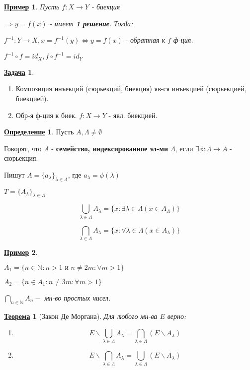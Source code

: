 \documentclass[12pt]{article}
\newcommand{\N}{\mathbb{N}}
\newtheorem{theorem}{\underline{Теорема}}[section]
\newtheorem*{example}{\underline{Пример}}
\theoremstyle{definition}
\newtheorem{definition}{\underline{Определение}}[section]
\theoremstyle{definition}
\newtheorem{task}{\underline{Задача}}[section]
\begin{document}
\begin{example}
Пусть $f: X \rightarrow Y$ - биекция

$\Rightarrow y = f(x)$ - имеет \textbf{1 решение}. Тогда:

$f^{-1}: Y \rightarrow X, x = f^{-1}(y) \iff y = f(x)$ - обратная к $f$ ф-ция.

$f^{-1} \circ f = id_X, f \circ f^{-1} = id_Y$
\end{example}

\begin{task}
\begin{enumerate}
    \item Композиция инъекций (сюрьекций, биекция) яв-ся инъекцией (сюрьекцией, биекцией).
    \item Обр-я ф-ция к биек. $f: X \rightarrow Y$ - явл. биекцией.
\end{enumerate}
\end{task}

\begin{definition}
Пусть $A, \Lambda \neq \emptyset$

Говорят, что $A$ - \textbf{семейство, индексированное эл-ми } $ \Lambda$, если $\exists \phi: \Lambda \rightarrow A$ - сюрьекция.

Пишут $A = \{a_\lambda\}_{\lambda \in \Lambda}$, где $a_\lambda = \phi(\lambda)$
 
$T = \{A_\lambda\}_{\lambda \in \Lambda}$ 

\[
    \bigcup_{\lambda \in \Lambda} A_\lambda = \{x \colon \exists \lambda \in \Lambda (x \in A_\Lambda)\}
\]

\[
    \bigcap_{\lambda \in \Lambda} A_\lambda = \{x \colon \forall \lambda \in \Lambda (x \in A_\lambda)\}
\]

\end{definition}

\begin{example}
~\newline
    
$A_1 = \{n \in \N \colon n > 1 \text{ и } n \neq 2m \colon \forall m > 1\}$

$A_2 = \{n \in A_1\colon n \neq 3m \colon \forall m > 1\}$

$\bigcap_{n \in \N} A_n - $ мн-во простых чисел.
\end{example}

\begin{theorem}[Закон Де Моргана]
Для любого мн-ва $E$ верно:
\begin{enumerate}
    \item
        \[
            E \backslash \bigcup_{\lambda \in \Lambda} A_\lambda = \bigcap_{\lambda \in \Lambda} (E \backslash A_\lambda)
        \]

    \item
        \[
            E \backslash \bigcap_{\lambda \in \Lambda} A_\lambda = \bigcup_{\lambda \in \Lambda} (E \backslash A_\lambda)
        \]
\end{enumerate}
\end{theorem}
\end{document}
